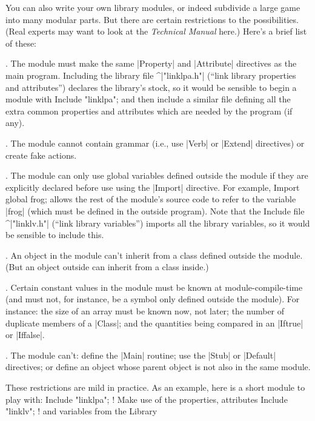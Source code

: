 \ddanger\ninepoint You can also write your own library modules, or indeed
subdivide a large game into many modular parts.  But there are certain
restrictions to the possibilities.  (Real experts may want to look at
the {\sl Technical Manual} here.)  Here's a brief list of these:

\ninepoint\medskip{}.\qquad 
The module must make the same |Property| and |Attribute| directives
as the main program.  Including the library file ^|"linklpa.h"|
(``link library properties and attributes'') declares the library's
stock, so it would be sensible to begin a module with
\beginstt
    Include "linklpa";
\endtt
and then include a similar file defining all the extra common properties
and attributes which are needed by the program (if any).

\medskip{}.\qquad 
The module cannot contain grammar (i.e., use |Verb| or |Extend| directives)
or create fake actions.

\medskip{}.\qquad 
The module can only use global variables defined outside the module
if they are explicitly declared before use using the |Import| directive.
For example,
\beginstt     
    Import global frog;
\endtt
allows the rest of the module's source code to refer to the variable
|frog| (which must be defined in the outside program).  Note that
the Include file ^|"linklv.h"| (``link library variables'') imports all
the library variables, so it would be sensible to include this.

\medskip{}.\qquad 
An object in the module can't inherit from a class defined outside
the module.  (But an object outside can inherit from a class inside.)

\medskip{}.\qquad 
Certain constant values in the module must be known at
module-compile-time (and must not, for instance, be a symbol only defined
outside the module).  For instance: the size of an array must be
known now, not later; the number of duplicate members of a |Class|;
and the quantities being compared in an |Iftrue| or |Iffalse|.

\medskip{}.\qquad 
The module can't: define the |Main| routine; use the |Stub| or |Default|
directives; or define an object whose parent object is not also in the
same module.

\bigskip\noindent These restrictions are mild in practice.  As an example,
here is a short module to play with:
\beginstt
    Include "linklpa";        ! Make use of the properties, attributes
    Include "linklv";         ! and variables from the Library

